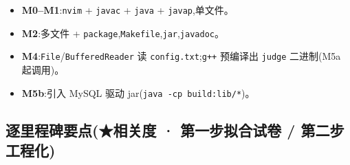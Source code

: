 \documentclass[
  11pt,
]{ctexart}
\providecommand{\tightlist}{%
  \setlength{\itemsep}{0pt}\setlength{\parskip}{0pt}}
\begin{document}
\begin{itemize}
\tightlist
\item
  \textbf{M0--M1}:\texttt{nvim} + \texttt{javac} + \texttt{java} +
  \texttt{javap},单文件。
\item
  \textbf{M2}:多文件 +
  \texttt{package},\texttt{Makefile},\texttt{jar},\texttt{javadoc}。
\item
  \textbf{M4}:\texttt{File}/\texttt{BufferedReader} 读
  \texttt{config.txt};\texttt{g++} 预编译出 \texttt{judge} 二进制(M5a
  起调用)。
\item
  \textbf{M5b}:引入 MySQL 驱动 jar(\texttt{java\ -cp\ build:lib/*})。
\end{itemize}

\hypertarget{ux9010ux91ccux7a0bux7891ux8981ux70b9ux76f8ux5173ux5ea6-ux7b2cux4e00ux6b65ux62dfux5408ux8bd5ux5377-ux7b2cux4e8cux6b65ux5de5ux7a0bux5316}{%
\subsection{逐里程碑要点(★相关度 · 第一步拟合试卷 /
第二步工程化)}\label{ux9010ux91ccux7a0bux7891ux8981ux70b9ux76f8ux5173ux5ea6-ux7b2cux4e00ux6b65ux62dfux5408ux8bd5ux5377-ux7b2cux4e8cux6b65ux5de5ux7a0bux5316}}
\end{document}
